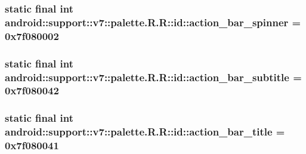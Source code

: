 \hypertarget{classandroid_1_1support_1_1v7_1_1palette_1_1_r_1_1id_a2cf84b20d0f7d70502c69df67ee513f}{
\subsubsection[{action\_\-bar\_\-spinner}]{\setlength{\rightskip}{0pt plus 5cm}static final int android::support::v7::palette.R.R::id::action\_\-bar\_\-spinner = 0x7f080002}}
\label{classandroid_1_1support_1_1v7_1_1palette_1_1_r_1_1id_a2cf84b20d0f7d70502c69df67ee513f}


\hypertarget{classandroid_1_1support_1_1v7_1_1palette_1_1_r_1_1id_8a5f6b01aeed84cffb51b8df06619e91}{
\subsubsection[{action\_\-bar\_\-subtitle}]{\setlength{\rightskip}{0pt plus 5cm}static final int android::support::v7::palette.R.R::id::action\_\-bar\_\-subtitle = 0x7f080042}}
\label{classandroid_1_1support_1_1v7_1_1palette_1_1_r_1_1id_8a5f6b01aeed84cffb51b8df06619e91}


\hypertarget{classandroid_1_1support_1_1v7_1_1palette_1_1_r_1_1id_a38e121716223ecf233abd08fca302f7}{
\subsubsection[{action\_\-bar\_\-title}]{\setlength{\rightskip}{0pt plus 5cm}static final int android::support::v7::palette.R.R::id::action\_\-bar\_\-title = 0x7f080041}}
\label{classandroid_1_1support_1_1v7_1_1palette_1_1_r_1_1id_a38e121716223ecf233abd08fca302f7}


